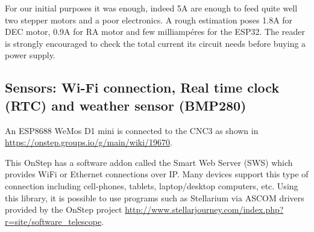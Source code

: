 For our initial purposes it was enough, indeed 5A are enough to feed quite well two stepper motors and a poor electronics.
A rough estimation poses 1.8A for DEC motor, 0.9A for RA motor and few milliampéres for the ESP32. 
The reader is strongly encouraged to check the total current its circuit needs before buying a power supply.

\subsection{Sensors: Wi-Fi connection, Real time clock (RTC) and weather sensor (BMP280)}
An ESP8688 WeMos D1 mini is connected to the CNC3 as shown in \url{https://onstep.groups.io/g/main/wiki/19670}.

This OnStep has a software addon called the Smart Web Server (SWS) which provides WiFi or Ethernet connections over IP.
Many devices support this type of connection including cell-phones, tablets, laptop/desktop computers, etc.
Using this library, it is possible to use programs such as Stellarium via ASCOM drivers provided by the OnStep project \url{http://www.stellarjourney.com/index.php?r=site/software_telescope}.
